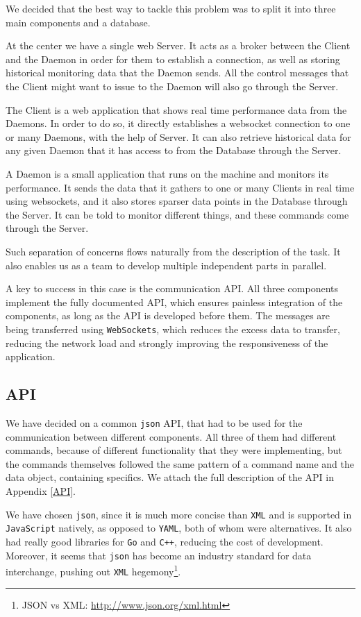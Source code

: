 \documentclass{l3proj}
\begin{document}
We decided that the best way to tackle this problem was to split it into three main components and a database.

At the center we have a single web Server. It acts as a broker between the Client and the Daemon in order for them to establish a connection, as well as storing historical monitoring data that the Daemon sends. All the control messages that the Client might want to issue to the Daemon will also go through the Server.

The Client is a web application that shows real time performance data from the Daemons. In order to do so, it directly establishes a websocket connection to one or many Daemons, with the help of Server. It can also retrieve historical data for any given Daemon that it has access to from the Database through the Server.

A Daemon is a small application that runs on the machine and monitors its performance. It sends the data that it gathers to one or many Clients in real time using websockets, and it also stores sparser data points in the Database through the Server. It can be told to monitor different things, and these commands come through the Server.

Such separation of concerns flows naturally from the description of the task. It also enables us as a team to develop multiple independent parts in parallel.

A key to success in this case is the communication API. All three components implement the fully documented API, which ensures painless integration of the components, as long as the API is developed before them. The messages are being transferred using \texttt{WebSockets}, which reduces the excess data to transfer, reducing the network load and strongly improving the responsiveness of the application.

\subsection{API}

We have decided on a common \texttt{json} API, that had to be used for the communication between different components. All three of them had different commands, because of different functionality that they were implementing, but the commands themselves followed the same pattern of a command name and the data object, containing specifics. We attach the full description of the API in Appendix \ref{API}. 

We have chosen \texttt{json}, since it is much more concise than \texttt{XML} and is supported in \texttt{JavaScript} natively, as opposed to \texttt{YAML}, both of whom were alternatives. It also had really good libraries for \texttt{Go} and \texttt{C++}, reducing the cost of development. Moreover, it seems that \texttt{json} has become an industry standard for data interchange, pushing out \texttt{XML} hegemony\footnote{\raggedright{}JSON vs XML: \url{http://www.json.org/xml.html}}. 
\end{document}
